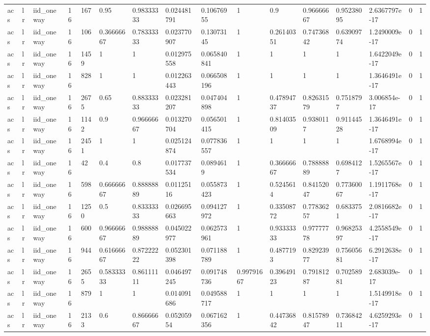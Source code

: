 \begin{tabular}{llllllllllllllll}
acs & lr & iid\_oneway & 16 & 167 & 0.95 & 0.98333333 & 0.024481791 & 0.10676955 & 1 & 0.9 & 0.96666667 & 0.95238095 & 2.6367797e-17 & 0 & 1 \\
acs & lr & iid\_oneway & 16 & 106 & 0.36666667 & 0.78333333 & 0.023770907 & 0.13073145 & 1 & 0.26140351 & 0.74736842 & 0.63909774 & 1.2490009e-17 & 0 & 1 \\
acs & lr & iid\_oneway & 16 & 1459 & 1 & 1 & 0.012975558 & 0.065840841 & 1 & 1 & 1 & 1 & 1.6422049e-17 & 0 & 1 \\
acs & lr & iid\_oneway & 16 & 828 & 1 & 1 & 0.012263443 & 0.066508196 & 1 & 1 & 1 & 1 & 1.3646491e-17 & 0 & 1 \\
acs & lr & iid\_oneway & 16 & 2675 & 0.65 & 0.88333333 & 0.023281207 & 0.047404898 & 1 & 0.47894737 & 0.82631579 & 0.7518797 & 3.006854e-17 & 0 & 1 \\
acs & lr & iid\_oneway & 16 & 1142 & 0.9 & 0.96666667 & 0.013270704 & 0.056501415 & 1 & 0.81403509 & 0.9380117 & 0.91144528 & 1.3646491e-17 & 0 & 1 \\
acs & lr & iid\_oneway & 16 & 2451 & 1 & 1 & 0.025124874 & 0.077836557 & 1 & 1 & 1 & 1 & 1.6768994e-17 & 0 & 1 \\
acs & lr & iid\_oneway & 16 & 42 & 0.4 & 0.8 & 0.017737534 & 0.0894619 & 1 & 0.36666667 & 0.78888889 & 0.6984127 & 1.5265567e-17 & 0 & 1 \\
acs & lr & iid\_oneway & 16 & 598 & 0.66666667 & 0.88888889 & 0.01125116 & 0.055873423 & 1 & 0.5245614 & 0.84152047 & 0.77360067 & 1.1911768e-17 & 0 & 1 \\
acs & lr & iid\_oneway & 16 & 1250 & 0.5 & 0.83333333 & 0.026695663 & 0.094127972 & 1 & 0.33508772 & 0.77836257 & 0.6833751 & 2.0816682e-17 & 0 & 1 \\
acs & lr & iid\_oneway & 16 & 600 & 0.96666667 & 0.98888889 & 0.045022977 & 0.062573961 & 1 & 0.93333333 & 0.97777778 & 0.96825397 & 4.2558549e-17 & 0 & 1 \\
acs & lr & iid\_oneway & 16 & 944 & 0.61666667 & 0.87222222 & 0.052301398 & 0.071188789 & 1 & 0.4877193 & 0.82923977 & 0.75605681 & 6.2912638e-17 & 0 & 1 \\
acs & lr & iid\_oneway & 16 & 2655 & 0.58333333 & 0.86111111 & 0.046497245 & 0.091748736 & 0.99791667 & 0.39649123 & 0.79181287 & 0.70258981 & 2.683039e-17 & 0 & 1 \\
acs & lr & iid\_oneway & 16 & 879 & 1 & 1 & 0.014091686 & 0.049588717 & 1 & 1 & 1 & 1 & 1.5149918e-17 & 0 & 1 \\
acs & lr & iid\_oneway & 16 & 2133 & 0.6 & 0.86666667 & 0.05205954 & 0.067162356 & 1 & 0.44736842 & 0.81578947 & 0.73684211 & 4.6259293e-17 & 0 & 1 \\

\end{tabular}
